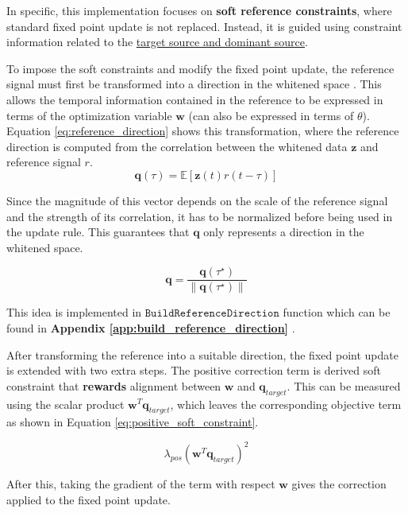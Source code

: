 In specific, this implementation focuses on \textbf{soft reference constraints}, where standard fixed point update is not replaced. Instead, it is guided using constraint information related to the \uline{target source and dominant source}.

To impose the soft constraints and modify the fixed point update, the reference signal must first be transformed into a direction in the whitened space  \cite{wang_fixed-point_2011}. This allows the temporal information contained in the reference to be expressed in terms of the optimization variable $\mathbf{w}$ (can also be expressed in terms of $\theta$). Equation \ref{eq:reference_direction} shows this transformation, where the reference direction is computed from the correlation between the whitened data $\mathbf{z}$ and reference signal $r$.
\begin{equation}
\mathbf{q}(\tau)
=
\mathbb{E}\left[\mathbf{z}(t) r(t-\tau)\right]
\label{eq:reference_direction}
\end{equation}

Since the magnitude of this vector depends on the scale of the reference signal and the strength of its correlation, it has to be normalized before being used in the update rule. This guarantees that $\mathbf{q}$ only represents a direction in the whitened space. 

\begin{equation}
\mathbf{q}
=
\frac{\mathbf{q}(\tau^\star)}
{\left\|\mathbf{q}(\tau^\star)\right\|}
\end{equation}

This idea is implemented in $\texttt{BuildReferenceDirection}$ function which can be found in \textbf{Appendix \ref{app:build_reference_direction}	}.

After transforming the reference into a suitable direction, the fixed point update is extended with two extra steps. The positive correction term is derived soft constraint that \textbf{rewards} alignment between $\mathbf{w}$ and $\mathbf{q}_{target}$. This can be measured using the scalar product $\mathbf{w}^T\mathbf{q}_{target}$, which leaves the corresponding objective term as shown in Equation \ref{eq:positive_soft_constraint}.

\begin{equation}
\lambda_{pos}
\left(
\mathbf{w}^{T}\mathbf{q}_{target}
\right)^2
\label{eq:positive_soft_constraint}
\end{equation}

After this, taking the gradient of the term with respect $\mathbf{w}$ gives the correction applied to the fixed point update.


